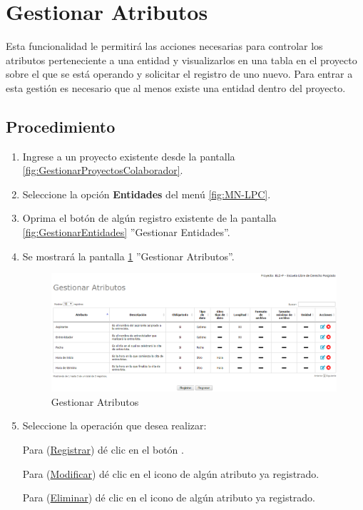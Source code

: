 \hypertarget{cv:gestionarAtributos}{\section{Gestionar Atributos}} \label{sec:GestionarAtributos}

	Esta funcionalidad le permitirá las acciones necesarias para controlar los atributos perteneciente a una entidad y visualizarlos en una tabla en el proyecto sobre el que se está operando y solicitar el registro de uno nuevo. Para entrar a esta gestión es necesario que al menos existe una entidad dentro del proyecto.

		\subsection{Procedimiento}

			\begin{enumerate}
				
			\item Ingrese a un proyecto existente desde la pantalla \ref{fig:GestionarProyectosColaborador}.
	
			\item Seleccione la opción \textbf{Entidades} del menú \ref{fig:MN-LPC}.
			
			\item Oprima el botón \IUAtributos{} de algún registro existente de la pantalla \ref{fig:GestionarEntidades} ''Gestionar Entidades''.
	
			\item Se mostrará la pantalla \ref{fig:GestionarAtributos} ''Gestionar Atributos''.

			\begin{figure}[h!]
				\begin{center}
					\includegraphics[scale=0.5]{roles/lider/entidades/atributos/pantallas/IU12-1-1-1gestionarAtributos}
					\caption{Gestionar Atributos}
					\label{fig:GestionarAtributos}
				\end{center}
			\end{figure}
		
				\item Seleccione la operación que desea realizar:
			
			Para (\hyperlink{cv:registrarEntidad}{Registrar}) dé clic en el botón \IURegistrar.
			
			Para (\hyperlink{cv:modificarEntidad}{Modificar}) dé clic en el icono \IUEditar{} de algún atributo ya registrado.
			
			Para (\hyperlink{cv:eliminarEntidad}{Eliminar}) dé clic en el icono \IUBotonEliminar{} de algún atributo ya registrado.
			\end{enumerate}
